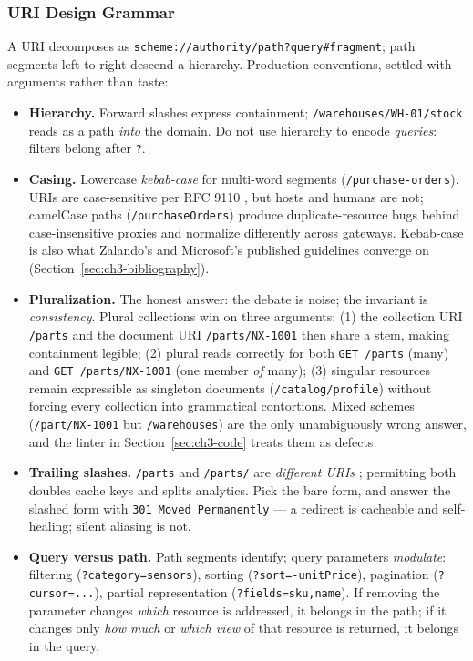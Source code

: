 \subsubsection{URI Design Grammar}
\label{sec:ch3-uri-grammar}

A URI decomposes as \texttt{scheme://authority/path?query\#fragment}; path
segments left-to-right descend a hierarchy. Production conventions, settled with
arguments rather than taste:

\begin{itemize}
  \item \textbf{Hierarchy.} Forward slashes express containment;
        \texttt{/warehouses/WH-01/stock} reads as a path \emph{into} the domain.
        Do not use hierarchy to encode \emph{queries}: filters belong after
        \texttt{?}.
  \item \textbf{Casing.} Lowercase \emph{kebab-case} for multi-word segments
        (\texttt{/purchase-orders}). URIs are case-sensitive per RFC 9110
        \cite{rfc9110}, but hosts and humans are not; camelCase paths
        (\texttt{/purchaseOrders}) produce duplicate-resource bugs behind
        case-insensitive proxies and normalize differently across gateways.
        Kebab-case is also what Zalando's and Microsoft's published guidelines
        converge on (Section~\ref{sec:ch3-bibliography}).
  \item \textbf{Pluralization.} The honest answer: the debate is noise; the
        invariant is \emph{consistency}. Plural collections win on three
        arguments: (1) the collection URI \texttt{/parts} and the document URI
        \texttt{/parts/NX-1001} then share a stem, making containment legible;
        (2) plural reads correctly for both \texttt{GET /parts} (many) and
        \texttt{GET /parts/NX-1001} (one member \emph{of} many); (3) singular
        resources remain expressible as singleton documents
        (\texttt{/catalog/profile}) without forcing every collection into
        grammatical contortions. Mixed schemes (\texttt{/part/NX-1001} but
        \texttt{/warehouses}) are the only unambiguously wrong answer, and the
        linter in Section~\ref{sec:ch3-code} treats them as defects.
  \item \textbf{Trailing slashes.} \texttt{/parts} and \texttt{/parts/} are
        \emph{different URIs} \cite{rfc9110}; permitting both doubles cache keys
        and splits analytics. Pick the bare form, and answer the slashed form
        with \texttt{301 Moved Permanently} --- a redirect is cacheable and
        self-healing; silent aliasing is not.
  \item \textbf{Query versus path.} Path segments identify; query parameters
        \emph{modulate}: filtering (\texttt{?category=sensors}), sorting
        (\texttt{?sort=-unitPrice}), pagination (\texttt{?cursor=...}), partial
        representation (\texttt{?fields=sku,name}). If removing the parameter
        changes \emph{which} resource is addressed, it belongs in the path; if it
        changes only \emph{how much} or \emph{which view} of that resource is
        returned, it belongs in the query.
\end{itemize}

